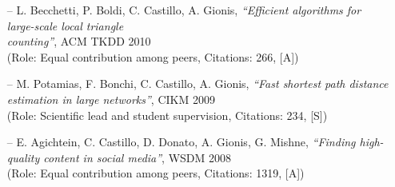 \documentclass[a4paper,11pt]{res}
\begin{document}
\begin{resume}
\begin{itemize}
\item [--]
{ L. Becchetti, P. Boldi, C. Castillo, A. Gionis},
{\em ``Efficient algorithms for large-scale local triangle } \\ {\em counting''},
ACM TKDD 2010
\\
(Role: Equal contribution among peers, {Citations:} 266, [A])		

\item [--]
{ M. Potamias, F. Bonchi, C. Castillo, A. Gionis},
{\em ``Fast shortest path distance estimation in large networks''},
CIKM 2009
\\
(Role: Scientific lead and student supervision, {Citations:} 234, [S])

\item[--]
{E. Agichtein, C. Castillo, D. Donato, A. Gionis, G. Mishne, }
{\em ``Finding high-quality content in social media''},
WSDM 2008 
\\
(Role: Equal contribution among peers,  {Citations:} 1319, {[A]})
\fi

\vspace{6mm}
\end{itemize}



\end{resume}
\end{document}
